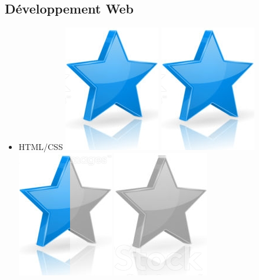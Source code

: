 \documentclass[10pt,a4paper,sans]{article}
\begin{document}
\begin{minipage}[t]{0.28\textwidth}
\begin{mdframed}[style=cadreCompetences]
        \subsection{Développement Web}
            \begin{itemize}
                \item{HTML/CSS
                    \hfill
                    \includegraphics[scale=0.20]{img/star.png} \hspace{-0.2cm}
                    \includegraphics[scale=0.20]{img/star.png} \hspace{-0.2cm}
                    \includegraphics[scale=0.20]{img/half_star.png} \hspace{-0.2cm}
                    \includegraphics[scale=0.20]{img/empty_star.png}
}
\end{itemize}
\end{mdframed}
\end{minipage}
\end{document}

